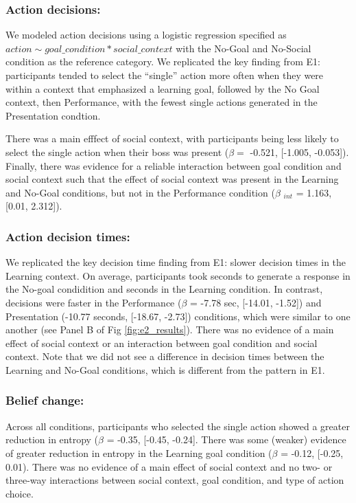 \documentclass[10pt, letterpaper]{article}
\begin{document}
\subsubsection{Action decisions:}\label{action-decisions-1}

We modeled action decisions using a logistic regression specified as
\texttt{$action \sim goal\_condition * social\_context$} with the
No-Goal and No-Social condition as the reference category. We replicated
the key finding from E1: participants tended to select the ``single''
action more often when they were within a context that emphasized a
learning goal, followed by the No Goal context, then Performance, with
the fewest single actions generated in the Presentation condtion.

There was a main efffect of social context, with participants being less
likely to select the single action when their boss was present
(\(\beta =\) -0.521, {[}-1.005, -0.053{]}). Finally, there was evidence
for a reliable interaction between goal condition and social context
such that the effect of social context was present in the Learning and
No-Goal conditions, but not in the Performance condition (\(\beta\)
\(_{int}\) = 1.163, {[}0.01, 2.312{]}).

\subsubsection{Action decision times:}\label{action-decision-times-1}

We replicated the key decision time finding from E1: slower decision
times in the Learning context. On average, participants took seconds to
generate a response in the No-goal condidition and seconds in the
Learning condition. In contrast, decisions were faster in the
Performance (\(\beta\) = -7.78 sec, {[}-14.01, -1.52{]}) and
Presentation (-10.77 seconds, {[}-18.67, -2.73{]}) conditions, which
were similar to one another (see Panel B of Fig \ref{fig:e2_results}).
There was no evidence of a main effect of social context or an
interaction between goal condition and social context. Note that we did
not see a difference in decision times between the Learning and No-Goal
conditions, which is different from the pattern in E1.

\subsubsection{Belief change:}\label{belief-change-1}

Across all conditions, participants who selected the single action
showed a greater reduction in entropy (\(\beta\) = -0.35, {[}-0.45,
-0.24{]}. There was some (weaker) evidence of greater reduction in
entropy in the Learning goal condition (\(\beta\) = -0.12, {[}-0.25,
0.01). There was no evidence of a main effect of social context and no
two- or three-way interactions between social context, goal condition,
and type of action choice.
\end{document}
